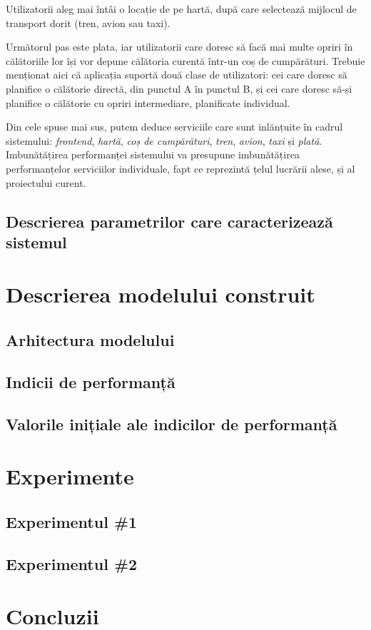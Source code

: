 \documentclass[12pt]{article}
\begin{document}
            Utilizatorii aleg mai întâi o locație de pe hartă, după care selectează mijlocul de transport dorit (tren, avion sau taxi).

            Următorul pas este plata, iar utilizatorii care doresc să facă mai multe opriri în călătoriile lor își vor depune călătoria curentă într-un coș de cum\-pă\-ră\-turi. Trebuie menționat aici că aplicația suportă două clase de utilizatori: cei care doresc să planifice o călătorie directă, din punctul A în punctul B, și cei care doresc să-și planifice o călătorie cu opriri intermediare, planificate individual.

            Din cele spuse mai sus, putem deduce serviciile care sunt inlănțuite în cadrul sistemului: \textit{frontend}, \textit{hartă}, \textit{coș de cumpărături}, \textit{tren}, \textit{avion}, \textit{taxi} și \textit{plată}. Imbunătățirea performanței sistemului va presupune imbunătățirea performanțelor serviciilor individuale, fapt ce reprezintă țelul lucrării alese, și al proiectului curent.
            \pagebreak

        \subsection{Descrierea parametrilor care caracterizează sistemul}
            \pagebreak


    \section{Descrierea modelului construit}

        \subsection{Arhitectura modelului}
            \lipsum[1-2]

        \subsection{Indicii de performanță}
            \lipsum[1-2]

        \subsection{Valorile inițiale ale indicilor de performanță}
            \lipsum[1-2]


    \section{Experimente}

        \subsection{Experimentul \#1}
            \lipsum[1-2]
        
        \subsection{Experimentul \#2}
            \lipsum[1-2]

    \section{Concluzii}
        \lipsum[1-2]
\end{document}
